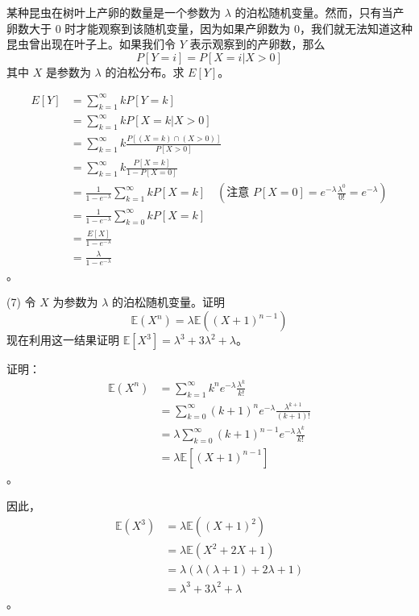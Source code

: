 \begin{questions}
\question 某种昆虫在树叶上产卵的数量是一个参数为 $\lambda$ 的泊松随机变量。然而，只有当产卵数大于 0 时才能观察到该随机变量，因为如果产卵数为 0，我们就无法知道这种昆虫曾出现在叶子上。如果我们令 $Y$ 表示观察到的产卵数，那么
\[
P[Y = i] = P[X = i | X > 0]
\]
其中 $X$ 是参数为 $\lambda$ 的泊松分布。求 $E[Y]$。

\begin{solution}
\begin{align*}
E[Y] &= \sum_{k=1}^{\infty} k P[Y = k] \tag{38} \\
&= \sum_{k=1}^{\infty} k P[X = k | X > 0] \tag{39} \\
&= \sum_{k=1}^{\infty} k \frac{P[(X = k) \cap (X > 0)]}{P[X > 0]} \tag{40} \\
&= \sum_{k=1}^{\infty} k \frac{P[X = k]}{1 - P[X = 0]} \tag{41} \\
&= \frac{1}{1 - e^{-\lambda}} \sum_{k=1}^{\infty} k P[X = k] \quad (\text{注意 } P[X = 0] = e^{-\lambda} \frac{\lambda^0}{0!} = e^{-\lambda}) \tag{42} \\
&= \frac{1}{1 - e^{-\lambda}} \sum_{k=0}^{\infty} k P[X = k] \tag{43} \\
&= \frac{E[X]}{1 - e^{-\lambda}} \tag{44} \\
&= \frac{\lambda}{1 - e^{-\lambda}} \tag{45}
\end{align*}。
\end{solution}

\question (7) 令 $X$ 为参数为 $\lambda$ 的泊松随机变量。证明
\[
\mathbb{E}(X^n) = \lambda \mathbb{E}\left((X + 1)^{n-1}\right)
\]
现在利用这一结果证明 $\mathbb{E}[X^3] = \lambda^3 + 3\lambda^2 + \lambda$。

\begin{solution}
证明：
\begin{align*}
\mathbb{E}(X^n) &= \sum_{k=1}^{\infty} k^n e^{-\lambda} \frac{\lambda^k}{k!} \\
&= \sum_{k=0}^{\infty} (k+1)^n e^{-\lambda} \frac{\lambda^{k+1}}{(k+1)!} \\
&= \lambda \sum_{k=0}^{\infty} (k+1)^{n-1} e^{-\lambda} \frac{\lambda^k}{k!} \\
&= \lambda \mathbb{E}\left[(X + 1)^{n-1}\right]
\end{align*}。

因此，
\begin{align*}
\mathbb{E}(X^3) &= \lambda \mathbb{E}\left((X + 1)^2\right) \\
&= \lambda \mathbb{E}(X^2 + 2X + 1) \\
&= \lambda \left(\lambda(\lambda + 1) + 2\lambda + 1\right) \\
&= \lambda^3 + 3\lambda^2 + \lambda
\end{align*}。
\end{solution}


\end{questions}
